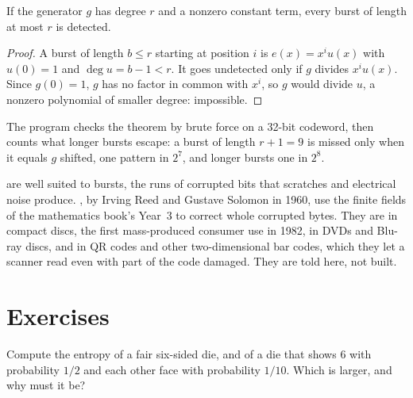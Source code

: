 \begin{theorem}\label{thm:b3:information-and-codes:burst}
If the generator $g$ has degree $r$ and a nonzero constant term, every burst of length at most $r$ is detected.
\end{theorem}

\begin{proof}
A burst of length $b \le r$ starting at position $i$ is $e(x) = x^i u(x)$ with $u(0) = 1$ and $\deg u = b - 1 < r$. It goes undetected only if $g$ divides $x^i u(x)$. Since $g(0) = 1$, $g$ has no factor in common with $x^i$, so $g$ would divide $u$, a nonzero polynomial of smaller degree: impossible.
\end{proof}

The program checks the theorem by brute force on a 32-bit codeword, then counts what longer bursts escape: a burst of length $r + 1 = 9$ is missed only when it equals $g$ shifted, one pattern in $2^7$, and longer bursts one in $2^8$.

\label{out:b3:information-and-codes:crc}

 are well suited to bursts, the runs of corrupted bits that scratches and electrical noise produce. %
, by Irving Reed and Gustave Solomon in 1960, use the finite fields of the mathematics book's Year~3 to correct whole corrupted bytes. %
They are in compact discs, the first mass-produced consumer use in 1982, in DVDs and Blu-ray discs, and in QR codes and other two-dimensional bar codes, which they let a scanner read even with part of the code damaged. %
They are told here, not built.

\section{Exercises}\label{sec:b3:information-and-codes:exercises}

\begin{exercise}[$\star$]\label{exo:b3:information-and-codes:1}
Compute the entropy of a fair six-sided die, and of a die that shows 6 with probability $1/2$ and each other face with probability $1/10$. Which is larger, and why must it be?
\end{exercise}

